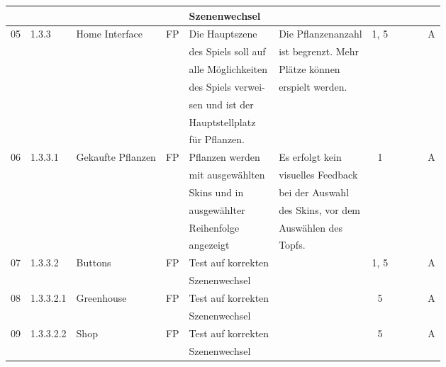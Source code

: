 \begin{longtable}{|c|l|l|c|l|l|c|c|l|l|l|}
            &       &            &    & Szenenwechsel &   &   & & & &\\
            \hline
            05 & 1.3.3 & Home Interface & FP & Die Hauptszene & Die Pflanzenanzahl & 1, 5 &  &  &  & A \\
            &       &            &    & des Spiels soll auf &  ist begrenzt. Mehr  &   & & & &\\
            &       &            &    & alle Möglichkeiten & Plätze können  &   & & & &\\
            &       &            &    & des Spiels verwei- & erspielt werden.  &   & & & &\\
            &       &            &    & sen und ist der &   &   & & & &\\
            &       &            &    & Hauptstellplatz &   &   & & & &\\
            &       &            &    & für Pflanzen. &   &   & & & &\\
            \hline
            06 & 1.3.3.1 & Gekaufte Pflanzen & FP & Pflanzen werden & Es erfolgt kein & 1 &  &  &  & A \\
            &       &            &    & mit ausgewählten &  visuelles Feedback  &   & & & &\\
            &       &            &    & Skins und in & bei der Auswahl  &   & & & &\\
            &       &            &    & ausgewählter & des Skins, vor dem  &   & & & &\\
            &       &            &    & Reihenfolge &  Auswählen des &   & & & &\\
            &       &            &    & angezeigt & Topfs.  &   & & & &\\
            \hline
            07 & 1.3.3.2 & Buttons & FP & Test auf korrekten &  & 1, 5 &  &  &  & A \\
            &       &            &    & Szenenwechsel &   &   & & & &\\
            \hline
            08 & 1.3.3.2.1 & Greenhouse & FP & Test auf korrekten &  & 5 &  &  &  & A \\
            &       &            &    & Szenenwechsel &   &   & & & &\\
            \hline
            09 & 1.3.3.2.2 & Shop & FP & Test auf korrekten &  & 5 &  &  &  & A \\
            &       &            &    & Szenenwechsel &   &   & & & &\\[5ex]
            \hline

\end{longtable}
